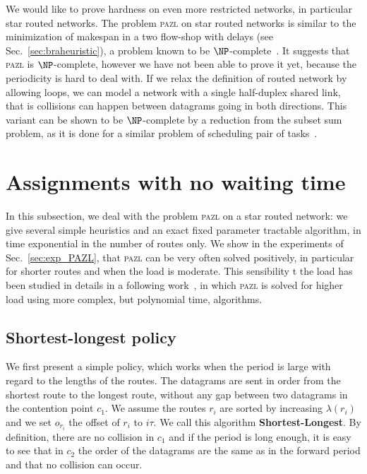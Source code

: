 \documentclass[a4paper,10pt]{article}
\newcommand\pazl{\textsc{pazl}\xspace}
\begin{document}
	We would like to prove hardness on even more restricted networks, in particular star routed networks.
   The problem \pazl on star routed networks is similar to the minimization of makespan in a two flow-shop with delays (see Sec.~\ref{sec:braheuristic}), a problem known to be $\NP$-complete~\cite{yu2004minimizing}. It suggests that \pazl is $\NP$-complete, however we have not been able to prove it yet,  because the periodicity is hard to deal with. If we relax the definition of routed network by allowing loops,
   we can model a network with a single half-duplex shared link, that is collisions can happen between datagrams going in both directions. This variant can be shown to be $\NP$-complete by a reduction from the subset sum problem, as it is done for a similar problem of scheduling pair of tasks~\cite{orman1997complexity}.
  

\section{Assignments with no waiting time} \label{sec:PAZL}
  
  In this subsection, we deal with the problem \pazl on a star routed network: 
  we give several simple heuristics and an exact fixed parameter tractable algorithm, in time exponential in the number of routes only. We show in the experiments of Sec.~\ref{sec:exp_PAZL}, that \pazl can be very often solved positively, in particular for shorter routes and when the load is moderate. This sensibility t the load has been studied in details in a following work~\cite{guiraud2020scheduling}, in which \pazl is solved for higher load using more complex, but polynomial time, algorithms. 
  
	\subsection{Shortest-longest policy}
    

    We first present a simple policy, which works when the period is large with regard to the lengths of the routes. The datagrams are sent in order from the shortest route to the longest route, without any gap between two datagrams in the contention point $c_1$. We assume the routes $r_i$ are sorted by increasing $\lambda(r_i)$ and we set $o_{r_i}$ the offset of $r_i$ to $i\tau$. We call this algorithm {\bf Shortest-Longest}. By definition, there are no collision in $c_1$ and if the period is long enough, 
     it is easy to see that in $c_2$ the order of the datagrams are the same as in the forward period and that no collision can occur. 
      
\end{document}
